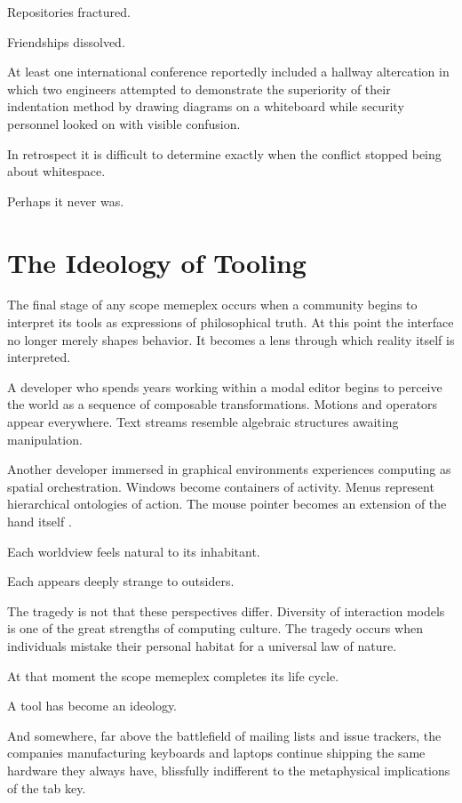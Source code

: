 \documentclass[12pt]{article}
\theoremstyle{definition}
\begin{document}
Repositories fractured.

Friendships dissolved.

At least one international conference reportedly included a hallway
altercation in which two engineers attempted to demonstrate the
superiority of their indentation method by drawing diagrams on a
whiteboard while security personnel looked on with visible confusion.

In retrospect it is difficult to determine exactly when the conflict
stopped being about whitespace.

Perhaps it never was.

\section{The Ideology of Tooling}

The final stage of any scope memeplex occurs when a community begins to
interpret its tools as expressions of philosophical truth. At this point
the interface no longer merely shapes behavior. It becomes a lens through
which reality itself is interpreted.

A developer who spends years working within a modal editor begins to
perceive the world as a sequence of composable transformations. Motions
and operators appear everywhere. Text streams resemble algebraic
structures awaiting manipulation.

Another developer immersed in graphical environments experiences
computing as spatial orchestration. Windows become containers of
activity. Menus represent hierarchical ontologies of action. The mouse
pointer becomes an extension of the hand itself \cite{norman1988}.

Each worldview feels natural to its inhabitant.

Each appears deeply strange to outsiders.

The tragedy is not that these perspectives differ. Diversity of
interaction models is one of the great strengths of computing culture.
The tragedy occurs when individuals mistake their personal habitat for
a universal law of nature.

At that moment the scope memeplex completes its life cycle.

A tool has become an ideology.

And somewhere, far above the battlefield of mailing lists and issue
trackers, the companies manufacturing keyboards and laptops continue
shipping the same hardware they always have, blissfully indifferent to
the metaphysical implications of the tab key.
\end{document}
